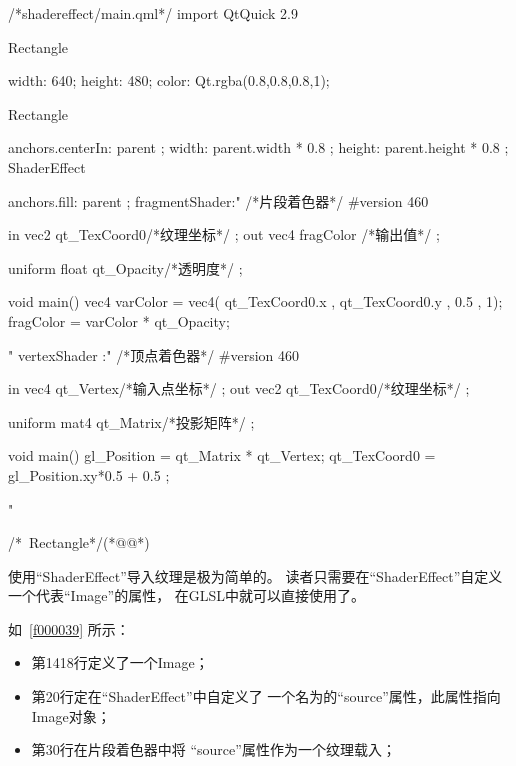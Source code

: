 \FloatBarrier
\begin{thebookfilesourceone}[escapeinside={(*@}{@*)},
label=f000038,
caption=GoodLuck,
title=\lstlistingname \thelstlisting
]
/*shadereffect/main.qml*/
import QtQuick 2.9

Rectangle {

    width: 640;
    height: 480;
    color: Qt.rgba(0.8,0.8,0.8,1);

    Rectangle{
        anchors.centerIn: parent    ;
        width: parent.width * 0.8   ;
        height: parent.height * 0.8 ;
        ShaderEffect{
            anchors.fill: parent ;
            fragmentShader:"
/*片段着色器*/
#version 460

in vec2  qt_TexCoord0/*纹理坐标*/  ;
out vec4 fragColor   /*输出值*/    ;

uniform float qt_Opacity/*透明度*/ ;

void main() {
    vec4 varColor  = vec4( qt_TexCoord0.x ,  qt_TexCoord0.y , 0.5 , 1);
    fragColor = varColor * qt_Opacity;
}

"
            vertexShader :"
/*顶点着色器*/
#version 460

in vec4 qt_Vertex/*输入点坐标*/    ;
out vec2 qt_TexCoord0/*纹理坐标*/  ;

uniform mat4 qt_Matrix/*投影矩阵*/ ;

void main() {
    gl_Position = qt_Matrix * qt_Vertex;
    qt_TexCoord0 = gl_Position.xy*0.5 + 0.5 ;
}

"
        }
    }

}/*~Rectangle*/(*@\marginpar[\hfill\setlength\fboxsep{2pt}\fbox{\footnotesize{\kaishu\parbox{1em}{\setlength{\baselineskip}{2pt}\lstlistingname}}\footnotesize{\thelstlisting}}]{\setlength\fboxsep{2pt}\fbox{\footnotesize{\kaishu\parbox{1em}{\setlength{\baselineskip}{2pt}\lstlistingname}}\footnotesize{\thelstlisting}}}@*)\end{thebookfilesourceone}          %


使用“ShaderEffect”导入纹理是极为简单的。
读者只需要在“ShaderEffect”自定义
一个代表“Image”的属性，
在GLSL中就可以直接使用了。

如\lstlistingname\ \ref{f000039}
所示：

\begin{itemize}

\item 第14\raisebox{0.16ex}{\sourcefonttwo\~{}}18行定义了一个Image；
\item 第20行定在“ShaderEffect”中自定义了
一个名为的“source”属性，此属性指向Image对象；
\item 第30行在片段着色器中将
“source”属性作为一个纹理载入；

\end{itemize}

